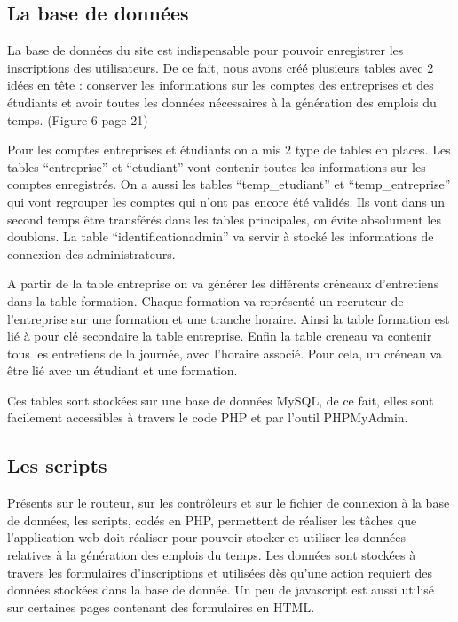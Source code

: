 \documentclass[12pt,a4paper]{article}
\begin{document}
\subsection{La base de données}

\begin{large}
\begin{onehalfspace}    La base de données du site est indispensable pour pouvoir enregistrer les inscriptions des utilisateurs. De ce fait, nous avons créé plusieurs tables avec 2 idées en tête : conserver les informations sur les comptes des entreprises et des étudiants et avoir toutes les données nécessaires à la génération des emplois du temps. (Figure 6 page 21)

    Pour les comptes entreprises et étudiants on a mis 2 type de tables en places. Les tables “entreprise” et “etudiant” vont contenir toutes les informations sur les comptes enregistrés. On a aussi les tables “temp\_etudiant” et “temp\_entreprise” qui vont regrouper les comptes qui n’ont pas encore été validés. Ils vont dans un second temps être transférés dans les tables principales, on évite absolument les doublons. La table “identificationadmin” va servir à stocké les informations de connexion des administrateurs.

    A partir de la table entreprise on va générer les différents créneaux d'entretiens dans la table formation. Chaque formation va représenté un recruteur de l’entreprise sur une formation et une tranche horaire. Ainsi la table formation est lié à pour clé secondaire la table entreprise. Enfin la table creneau va contenir tous les entretiens de la journée, avec l’horaire associé. Pour cela, un créneau va être lié avec un étudiant et une formation.

	Ces tables sont stockées sur une base de données MySQL, de ce fait, elles sont facilement accessibles à travers le code PHP et par l’outil PHPMyAdmin.
\end{onehalfspace}
\end{large}

\subsection{Les scripts}

\begin{large}
\begin{onehalfspace}Présents sur le routeur, sur les contrôleurs et sur le fichier de connexion à la base de données, les scripts, codés en PHP, permettent de réaliser les tâches que l’application web doit réaliser pour pouvoir stocker et utiliser les données relatives à la génération des emplois du temps. Les données sont stockées à travers les formulaires d’inscriptions et utilisées dès qu’une action requiert des données stockées dans la base de donnée. Un peu de javascript est aussi utilisé sur certaines pages contenant des formulaires en HTML.
\end{onehalfspace}
\end{large}
\end{document}

